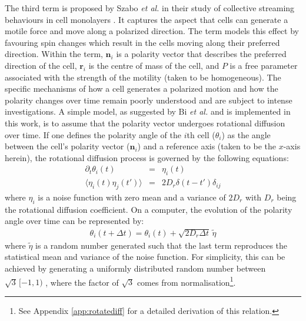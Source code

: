 \documentclass[a4paper,12pt]{article}
\begin{document}
The third term is proposed by Szabo \emph{et al.} in their study of collective streaming behaviours in cell monolayers \cite{szabo2010}. It captures the aspect that  cells can generate a motile force and move along a polarized direction. The term models this effect by favouring spin changes which result in the cells moving along their preferred direction. Within the term, $\bm{n}_i$ is a polarity vector that describes the preferred direction of the cell, $\bm{r}_i$ is the centre of mass of the cell, and $P$ is a free parameter associated with the strength of the motility (taken to be homogeneous). The specific mechanisms of how a cell generates a polarized motion and how the polarity changes over time remain poorly understood and are subject to intense investigations\cite{ridley2003,mori2008}. A simple model, as suggested by Bi \emph{et al.} \cite{bi2015motility} and is implemented in this work, is to assume that the polarity vector undergoes rotational diffusion over time. If one defines the polarity angle of the $i$th cell ($\theta_i$) as the angle between the cell's polarity vector ($\bm{n}_i$) and a reference axis (taken to be the $x$-axis herein), the rotational diffusion process is governed by the following equations:
\begin{eqnarray}
\partial_t\theta_i(t) & = & \eta_i(t)\\
\langle{\eta_i(t)\eta_j(t')\rangle} & = & 2D_r\delta(t-t')\delta_{ij}
\end{eqnarray}
where $\eta_i$ is a noise function with zero mean and a variance of $2D_r$ with $D_r$ being the rotational diffusion coefficient. On a computer, the evolution of the polarity angle over time can be represented by:
\begin{eqnarray}
\label{eqn:computerRotateDiff}
\theta_i(t+\Delta t) = \theta_i(t) + \sqrt{2D_r\Delta t}\,\tilde\eta
\end{eqnarray}
where $\tilde\eta$ is a random number generated such that the last term reproduces the statistical mean and variance of the noise function. For simplicity, this can be achieved by generating a uniformly distributed random number between $\sqrt{3}\,[-1,1)$ , where the factor of $\sqrt{3}$ comes from normalisation\footnote{See Appendix \ref{app:rotatediff} for a detailed derivation of this relation.}.
\end{document}
